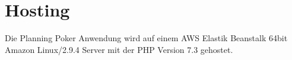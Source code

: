 \chapter{Hosting}\label{ch:hosting}
Die Planning Poker Anwendung wird auf einem AWS Elastik Beanstalk 64bit Amazon Linux/2.9.4 Server mit der PHP Version 7.3 gehostet.

